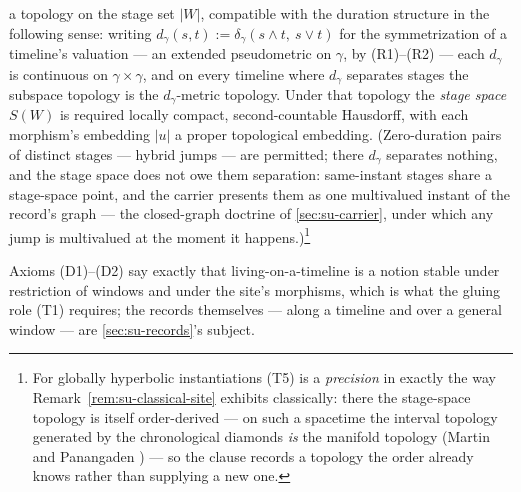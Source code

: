 \begin{definition}
\begin{enumerate}
  a topology on the stage set $|W|$, compatible with the duration
  structure in the following sense: writing
  $d_\gamma(s,t) := \delta_\gamma(s \wedge t,\ s \vee t)$ for the
  symmetrization of a timeline's valuation --- an extended
  pseudometric on $\gamma$, by (R1)--(R2) --- each $d_\gamma$ is
  continuous on $\gamma \times \gamma$, and on every timeline where
  $d_\gamma$ separates stages the subspace topology is the
  $d_\gamma$-metric topology. Under that topology the \emph{stage
  space} $S(W)$ is required locally compact, second-countable
  Hausdorff, with each morphism's embedding $|u|$ a proper
  topological embedding. (Zero-duration pairs of distinct stages ---
  hybrid jumps --- are permitted; there $d_\gamma$ separates
  nothing, and the stage space does not owe them separation:
  same-instant stages share a stage-space point, and the carrier
  presents them as one multivalued instant of the record's graph ---
  the closed-graph doctrine of \autoref{sec:su-carrier}, under which
  any jump is multivalued at the moment it happens.)\footnote{For globally hyperbolic instantiations
  (T5) is a \emph{precision} in exactly the way
  Remark~\ref{rem:su-classical-site} exhibits classically: there the
  stage-space topology is itself order-derived --- on such a
  spacetime the interval topology generated by the chronological
  diamonds \emph{is} the manifold topology (Martin and Panangaden
  \cite{martin04}) --- so the clause records a topology the order
  already knows rather than supplying a new one.}
\end{enumerate}
Axioms (D1)--(D2) say exactly that living-on-a-timeline is a notion
stable under restriction of windows and under the site's morphisms,
which is what the gluing role (T1) requires; the records themselves
--- along a timeline and over a general window --- are
\autoref{sec:su-records}'s subject.
\end{definition}

